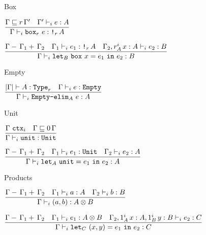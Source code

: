 \begin{frame}{Box}

\begin{center}
  $\infrule{\subusagectx{\Gamma}{\scalectx{r}{\Gamma'}} \quad \typing[\Gamma']{e}{A}}{\typing[\Gamma]{\boxintro[r]{e}}{\Box[r]{A}}}$

  \vspace{2em}

  $\infrule{\decomposectx{\Gamma}{\Gamma_1}{\Gamma_2} \quad \typing[\Gamma_1]{e_1}{\Box[r]{A}} \quad \typing[\extend{\Gamma_2}[\totalqty{r}{A}]{x}{A}]{e_2}{B}}{\typing[\Gamma]{\boxelim{x}{e_1}{e_2}[B]}{B}}$
\end{center}

\end{frame}

\begin{frame}{Empty}

\begin{center}
  $\infrule{\type[\cartesianize{\Gamma}]{A}[r] \quad \typing[\Gamma]{e}{\Empty}}{\typing[\Gamma]{\emptyelim{e}[A]}{A}}$
\end{center}

\end{frame}

\begin{frame}{Unit}

\begin{center}
  $\infrule{\ctx{\Gamma} \quad \subusagectx{\Gamma}{\scalectx{\Zero}{\Gamma}}}{\typing[\Gamma]{\unit}{\Unit}}$

  \vspace{2em}

  $\infrule{\decomposectx{\Gamma}{\Gamma_1}{\Gamma_2} \quad \typing[\Gamma_1]{e_1}{\Unit} \quad \typing[\Gamma_2]{e_2}{A}}{\typing[\Gamma]{\unitelim{e_1}{e_2}[A]}{A}}$
\end{center}

\end{frame}

\begin{frame}{Products}

\begin{center}
  $\infrule{\decomposectx{\Gamma}{\Gamma_1}{\Gamma_2} \quad \typing[\Gamma_1]{a}{A} \quad \typing[\Gamma_2]{b}{B}}{\typing[\Gamma]{\pair{a}{b}}{\Prod{A}{B}}}$

  \vspace{2em}

  $\infrule{\decomposectx{\Gamma}{\Gamma_1}{\Gamma_2} \quad \typing[\Gamma_1]{e_1}{\Prod{A}{B}} \quad \typing[\extend{\extend{\Gamma_2}[\totalqty{\One}{A}]{x}{A}}[\totalqty{\One}{B}]{y}{B}]{e_2}{C}}{\typing[\Gamma]{\letpair{x}{y}{e_1}{e_2}[C]}{C}}$
\end{center}

\end{frame}

